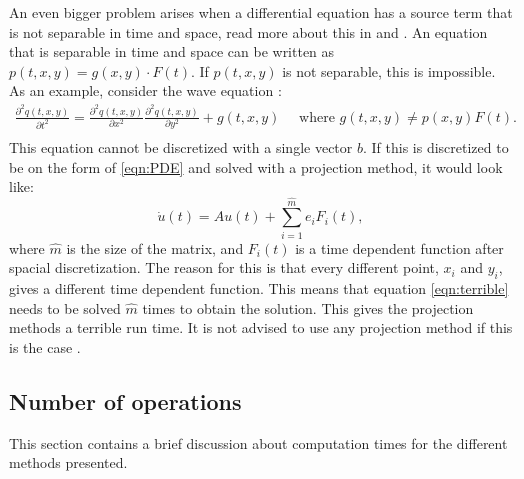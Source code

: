 \noindent An even bigger problem arises when a differential equation has a source term that is not separable in time and space, read more about this in \cite{elena} and \citep{min}. An equation that is separable in time and space can be written as $p(t,x,y) = g(x,y) \cdot F(t)$. If $p(t,x,y)$ is not separable, this is impossible. As an example, consider the wave equation \cite{waveequ}:
\begin{equation*}
\begin{aligned}
\frac{\partial^2 q(t,x,y)}{\partial t^2} = \frac{\partial^2 q(t,x,y)}{\partial x^2 } \frac{\partial^2 q(t,x,y)}{\partial y^2 } + g(t,x,y) \quad \text{ where } g(t,x,y) \neq p(x,y) F(t). \\
\end{aligned}
\end{equation*}
This equation cannot be discretized with a single vector $b$. If this is discretized to be on the form of \eqref{eqn:PDE} and solved with a projection method, it would look like:
\begin{equation*} \label{eqn:terrible}
\dot{u}(t) = A u(t) + \sum \limits_{i = 1}^{\hat{m}} e_i F_i(t),
\end{equation*}
where $\hat{m}$ is the size of the matrix, and $F_i(t)$ is a time dependent function after spacial discretization. The reason for this is that every different point, $x_i$ and $y_i$, gives a different time dependent function.%
This means that equation \eqref{eqn:terrible} needs to be solved $\hat{m}$ times to obtain the solution. This gives the projection methods a terrible run time. It is not advised  to use any projection method if this is the case \cite{min}.


\subsection{Number of operations}%
This section contains a brief discussion about computation times for the different methods presented.


